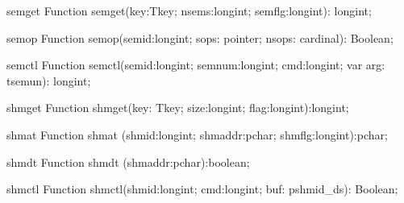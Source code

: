 \begin{function}{semget}
\Declaration
Function semget(key:Tkey; nsems:longint; semflg:longint): longint;
\Description
\Errors
\SeeAlso
\end{function}

\begin{function}{semop}
\Declaration
Function semop(semid:longint; sops: pointer; nsops: cardinal): Boolean;
\Description
\Errors
\SeeAlso
\end{function}

\begin{function}{semctl}
\Declaration
Function semctl(semid:longint; semnum:longint; cmd:longint; var arg: tsemun): longint;
\Description
\Errors
\SeeAlso
\end{function}

\begin{function}{shmget}
\Declaration
Function shmget(key: Tkey; size:longint; flag:longint):longint;
\Description
\Errors
\SeeAlso
\end{function}

\begin{function}{shmat}
\Declaration
Function shmat (shmid:longint; shmaddr:pchar; shmflg:longint):pchar;
\Description
\Errors
\SeeAlso
\end{function}

\begin{function}{shmdt}
\Declaration
Function shmdt (shmaddr:pchar):boolean;
\Description
\Errors
\SeeAlso
\end{function}

\begin{function}{shmctl}
\Declaration
Function shmctl(shmid:longint; cmd:longint; buf: pshmid\_ds): Boolean;
\Description
\Errors
\SeeAlso
\end{function}

